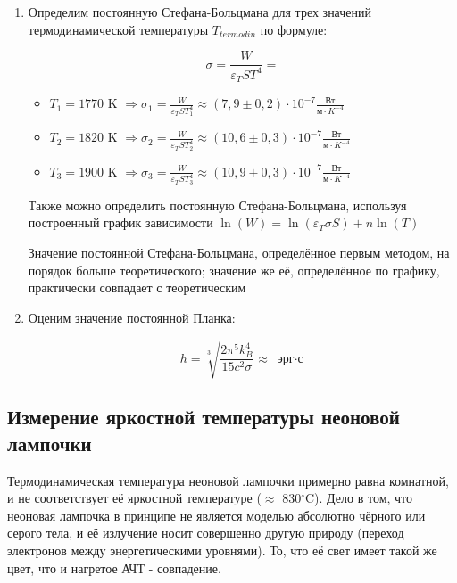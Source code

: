 \documentclass[15pt,a5paper,reqno]{article}
\begin{document}
\begin{enumerate}
\item Определим постоянную Стефана-Больцмана для трех значений термодинамической температуры $T_{termodin}$ по формуле:

\[  \sigma = \frac{W}{\varepsilon_T S T^4} =   \]

\begin{itemize}
    \item $T_1 = 1770$ K $\Rightarrow \sigma_1 = \frac{W}{\varepsilon_T S T_{1}^{4}} \approx (7,9 \pm 0,2) \cdot 10^{-7} \frac{Вт}{м \cdot K^{-4}}  $
    \item $T_2 = 1820$ K $\Rightarrow \sigma_2 = \frac{W}{\varepsilon_T S T_{2}^{4}} \approx (10,6 \pm 0,3)  \cdot 10^{-7} \frac{Вт}{м \cdot K^{-4}}  $
    \item $T_3 = 1900$ K $\Rightarrow \sigma_3 = \frac{W}{\varepsilon_T S T_{3}^{4}} \approx (10,9 \pm 0,3) \cdot 10^{-7} \frac{Вт}{м \cdot K^{-4}}  $
\end{itemize}


Также можно определить постоянную Стефана-Больцмана, используя построенный график зависимости $\ln(W) = \ln(\varepsilon_T \sigma S) + n \ln(T)$


Значение постоянной Стефана-Больцмана, определённое первым методом, на порядок больше теоретического; значение же её, определённое по графику, практически совпадает с теоретическим


\item Оценим значение постоянной Планка:

\[ h = \sqrt[3]{\frac{2 \pi^5 k_B^4}{15 c^2 \sigma}} \approx    \text{ эрг$\cdot$с} \]

\end{enumerate}

\subsection{Измерение яркостной температуры неоновой лампочки}
Термодинамическая температура неоновой лампочки примерно равна комнатной, и не соответствует её яркостной температуре ($\approx$ 830$^{\circ}$C). Дело в том, что неоновая лампочка в принципе не является моделью абсолютно чёрного или серого тела, и её излучение носит совершенно другую природу (переход электронов между энергетическими уровнями). То, что её свет имеет такой же цвет, что и нагретое АЧТ - совпадение.
\end{document}
